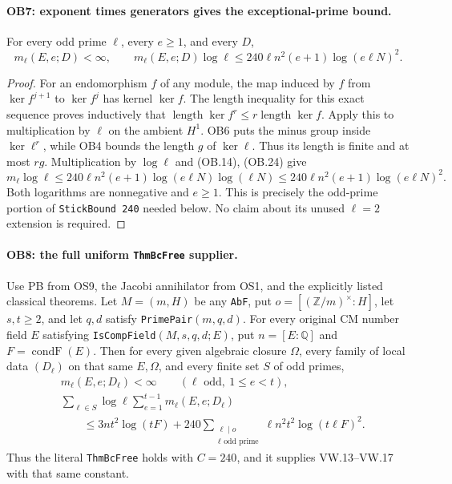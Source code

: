 \paragraph{OB7: exponent times generators gives the exceptional-prime bound.}
\label{claim:OB7}
For every odd prime $\ell$, every $e\ge1$, and every $D$,
\[
 m_\ell(E,e;D)<\infty,\qquad
 m_\ell(E,e;D)\log\ell
       \le240\ell n^2(e+1)\log(e\ell N)^2.
 \tag{OB.29}
\]

\begin{proof}
For an endomorphism $f$ of any module, the map induced by $f$ from
$\ker f^{j+1}$ to $\ker f^j$ has kernel $\ker f$.
The length inequality for this exact sequence proves inductively
that $\operatorname{length}\ker f^r\le
r\operatorname{length}\ker f$.
Apply this to multiplication by $\ell$ on the ambient $H^1$.
OB6 puts the minus group inside $\ker\ell^r$, while OB4 bounds
the length $g$ of $\ker\ell$.  Thus its length is finite and at
most $rg$.  Multiplication by $\log\ell$ and (OB.14), (OB.24)
give
\[
 m_\ell\log\ell
   \le240\ell n^2(e+1)\log(e\ell N)\log(\ell N)
   \le240\ell n^2(e+1)\log(e\ell N)^2.
\]
Both logarithms are nonnegative and $e\ge1$.  This is precisely
the odd-prime portion of \texttt{StickBound 240} needed below.
No claim about its unused $\ell=2$ extension is required.
\end{proof}

\paragraph{OB8: the full uniform \texttt{ThmBcFree} supplier.}
\label{claim:OB8}
Use PB from OS9, the Jacobi annihilator from OS1, and the explicitly
listed classical theorems.  Let
$M=(m,H)$ be any \texttt{AbF}, put $o=[(\mathbb Z/m)^\times:H]$,
let $s,t\ge2$, and let $q,d$ satisfy \texttt{PrimePair}$(m,q,d)$.
For every original CM number field $E$ satisfying
\texttt{IsCompField}$(M,s,q,d;E)$, put
$n=[E:\mathbb Q]$ and $F=\operatorname{condF}(E)$.
Then for every given algebraic closure $\Omega$, every family of
local data $(D_\ell)$ on that same $E,\Omega$, and every finite
set $S$ of odd primes,
\[
 \begin{split}
 &m_\ell(E,e;D_\ell)<\infty
                 \qquad(\ell\text{ odd},\ 1\le e<t),\\
 &\sum_{\ell\in S}\log\ell\sum_{e=1}^{t-1}
                         m_\ell(E,e;D_\ell)\\
 &\qquad\le3nt^2\log(tF)
       +240\sum_{\substack{\ell\mid o\\\ell\text{ odd prime}}}
                       \ell n^2t^2\log(t\ell F)^2.
 \end{split}                                                   \tag{OB.30}
\]
Thus the literal \texttt{ThmBcFree} holds with $C=240$, and it
supplies VW.13--VW.17 with that same constant.

